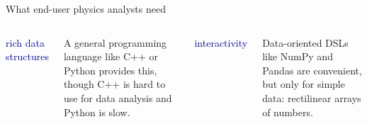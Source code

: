 \documentclass[aspectratio=169]{beamer}
\begin{document}

\begin{frame}{What end-user physics analysts need}
\Large

\begin{columns}
\begin{center}
\textcolor{darkblue}{\LARGE rich data structures}
\end{center}

\vspace{0.25 cm}
A general programming language like C++ or Python provides this, though C++ is hard to use for data analysis and Python is slow.

\begin{center}
\textcolor{darkblue}{\LARGE interactivity}

\end{center}

\vspace{0.25 cm}
Data-oriented DSLs like NumPy and Pandas are convenient, but only for simple data: rectilinear arrays of numbers.
\end{columns}



\end{frame}
\end{document}
